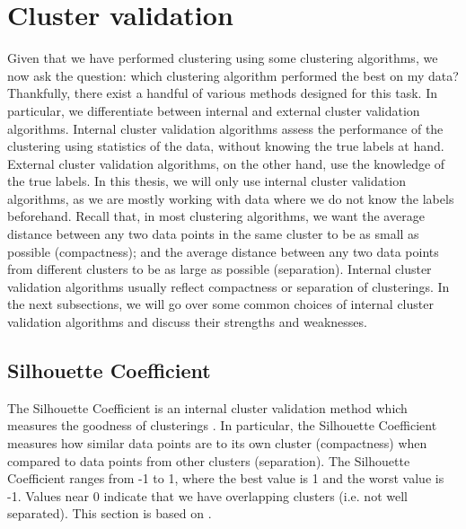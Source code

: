 \section{Cluster validation}
\label{sec:cluster-validation}
Given that we have performed clustering using some clustering algorithms, we now ask the question: which clustering algorithm performed the best on my data? Thankfully, there exist a handful of various methods designed for this task. In particular, we differentiate between internal and external cluster validation algorithms. Internal cluster validation algorithms assess the performance of the clustering using statistics of the data, without knowing the true labels at hand. External cluster validation algorithms, on the other hand, use the knowledge of the true labels. In this thesis, we will only use internal cluster validation algorithms, as we are mostly working with data where we do not know the labels beforehand. Recall that, in most clustering algorithms, we want the average distance between any two data points in the same cluster to be as small as possible (compactness); and the average distance between any two data points from different clusters to be as large as possible (separation). Internal cluster validation algorithms usually reflect compactness or separation of clusterings. In the next subsections, we will go over some common choices of internal cluster validation algorithms and discuss their strengths and weaknesses.

\subsection{Silhouette Coefficient}
\label{sec:silhouette-coefficient}
The Silhouette Coefficient is an internal cluster validation method which measures the goodness of clusterings \cite[p. 87]{Kaufman1990}. In particular, the Silhouette Coefficient measures how similar data points are to its own cluster (compactness) when compared to data points from other clusters (separation). The Silhouette Coefficient ranges from -1 to 1, where the best value is 1 and the worst value is -1. Values near 0 indicate that we have overlapping clusters (i.e. not well separated). This section is based on \cite[p. 87]{Kaufman1990}.

